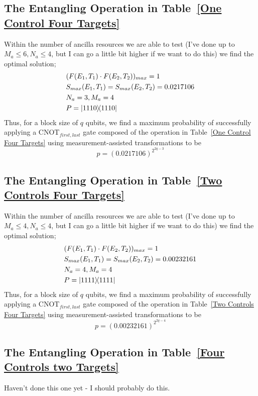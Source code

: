 \documentclass[aps,pra,twocolumn,showpacs,superscriptaddress,floatfix,10pt]{revtex4}
\begin{document}
\subsection{The Entangling Operation in Table~\ref{One Control Four Targets}}
Within the number of ancilla resources we are able to test (I've done up to $M_a \le 6,N_a \le 4$, but I can go a little bit higher if we want to do this) we find the optimal solution;
\begin{eqnarray}
& (F(E_1,T_1) \cdot F(E_2,T_2))_{max} = 1 \\
& S_{max}(E_1,T_1) = S_{max}(E_2,T_2) = 0.0217106 \\
& N_a = 3,M_a=4 \\
& P = \outerproduct{1110}{1110}	
\end{eqnarray}
Thus, for a block size of $q$ qubits, we find a maximum probability of successfully applying a $\mbox{CNOT}_{first,last}$ gate composed of the operation in Table~\ref{One Control Four Targets} using measurement-assisted transformations to be
\begin{equation}
\label{1C4T Result}
p = (0.0217106)^{2^{2q-3}}
\end{equation}
\subsection{The Entangling Operation in Table~\ref{Two Controls Four Targets}}
 Within the number of ancilla resources we are able to test (I've done up to $M_a \le 4,N_a \le 4$, but I can go a little bit higher if we want to do this) we find the optimal solution;
 \begin{eqnarray}
 & (F(E_1,T_1) \cdot F(E_2,T_2))_{max} = 1 \\
 & S_{max}(E_1,T_1) = S_{max}(E_2,T_2) = 0.00232161 \\
 & N_a = 4,M_a=4 \\
 & P = \outerproduct{1111}{1111}	
 \end{eqnarray}
 Thus, for a block size of $q$ qubits, we find a maximum probability of successfully applying a $\mbox{CNOT}_{first,last}$ gate composed of the operation in Table~\ref{Two Controls Four Targets} using measurement-assisted transformations to be
 \begin{equation}
 \label{2C4T Result}
 p = (0.00232161)^{2^{2q-4}}
 \end{equation}
 \subsection{The Entangling Operation in Table~\ref{Four Controls two Targets}}
 Haven't done this one yet - I should probably do this.
\end{document}
